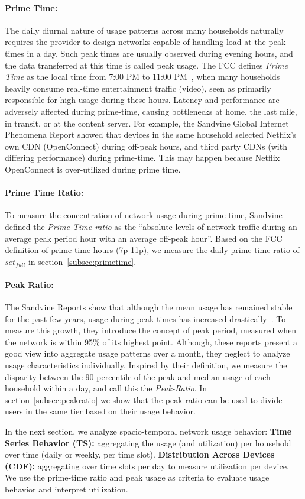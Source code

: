\paragraph{Prime Time: }The daily diurnal nature of usage patterns across many
households naturally requires the provider to design networks capable of handling 
load at the peak times in a day. Such peak times are usually observed during
evening hours, and the data transferred at this time is called peak usage.
The FCC defines \emph{Prime Time} as the local time from 7:00 PM to 11:00
PM~\cite{fcc2014measuring-broadband}, when many
households heavily consume real-time entertainment traffic (video), seen as primarily
responsible for high usage during these hours. Latency and performance are adversely
affected during prime-time, causing bottlenecks at home, the last mile, in
transit, or at the content server. For example, the Sandvine Global
Internet Phenomena Report showed that devices in the same household selected Netflix's
own CDN (OpenConnect) during off-peak hours, and third party CDNs (with differing performance)
during prime-time. This may happen because Netflix OpenConnect is over-utilized during prime time.

\paragraph{Prime Time Ratio: }To measure the concentration of network usage during prime time,
Sandvine defined the \emph{Prime-Time ratio} as the ``absolute levels of network traffic
during an average peak period hour with an average off-peak hour''. Based on the FCC
definition of prime-time hours (7p-11p), we measure the daily prime-time ratio of $set_{full}$
in section~\ref{subsec:primetime}.

\paragraph{Peak Ratio: }The Sandvine Reports show that although the mean usage has remained
stable for the past few years, usage during peak-times has increased
drastically~\cite{sandvine2014report1}. To measure this growth, they introduce the
concept of peak period, measured when the network is within 95\% of its highest point.
Although, these reports present a good view into aggregate usage patterns over a month,
they neglect to analyze usage characteristics individually. Inspired by their
definition, we measure the disparity between the 90 percentile of the peak and median
usage of each household within a day, and call this the \emph{Peak-Ratio}. In
section~\ref{subsec:peakratio} we show that the peak ratio can be used
to divide users in the same tier based on their usage behavior.

In the next section, we analyze spacio-temporal network usage behavior:
\textbf{Time Series Behavior (TS): }aggregating the usage (and utilization) per household
over time (daily or weekly, per time slot). \textbf{Distribution Across Devices (CDF): }aggregating over time slots per day to measure utilization per device. We use the prime-time ratio and peak usage
as criteria to evaluate usage behavior and interpret utilization.